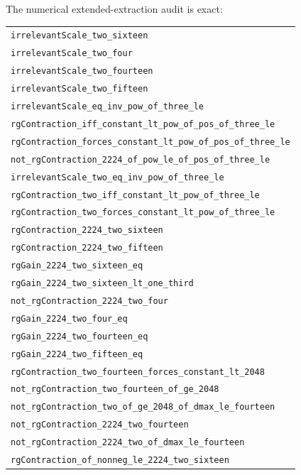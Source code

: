 \documentclass[11pt]{article}
\newcommand{\leansmall}[1]{{\small\texttt{#1}}}
\begin{document}
The numerical extended-extraction audit is exact:
\begin{center}
\begin{tabular}{l}
\leansmall{irrelevantScale\_two\_sixteen}\\
\leansmall{irrelevantScale\_two\_four}\\
\leansmall{irrelevantScale\_two\_fourteen}\\
\leansmall{irrelevantScale\_two\_fifteen}\\
\leansmall{irrelevantScale\_eq\_inv\_pow\_of\_three\_le}\\
\leansmall{rgContraction\_iff\_constant\_lt\_pow\_of\_pos\_of\_three\_le}\\
\leansmall{rgContraction\_forces\_constant\_lt\_pow\_of\_pos\_of\_three\_le}\\
\leansmall{not\_rgContraction\_2224\_of\_pow\_le\_of\_pos\_of\_three\_le}\\
\leansmall{irrelevantScale\_two\_eq\_inv\_pow\_of\_three\_le}\\
\leansmall{rgContraction\_two\_iff\_constant\_lt\_pow\_of\_three\_le}\\
\leansmall{rgContraction\_two\_forces\_constant\_lt\_pow\_of\_three\_le}\\
\leansmall{rgContraction\_2224\_two\_sixteen}\\
\leansmall{rgContraction\_2224\_two\_fifteen}\\
\leansmall{rgGain\_2224\_two\_sixteen\_eq}\\
\leansmall{rgGain\_2224\_two\_sixteen\_lt\_one\_third}\\
\leansmall{not\_rgContraction\_2224\_two\_four}\\
\leansmall{rgGain\_2224\_two\_four\_eq}\\
\leansmall{rgGain\_2224\_two\_fourteen\_eq}\\
\leansmall{rgGain\_2224\_two\_fifteen\_eq}\\
\leansmall{rgContraction\_two\_fourteen\_forces\_constant\_lt\_2048}\\
\leansmall{not\_rgContraction\_two\_fourteen\_of\_ge\_2048}\\
\leansmall{not\_rgContraction\_two\_of\_ge\_2048\_of\_dmax\_le\_fourteen}\\
\leansmall{not\_rgContraction\_2224\_two\_fourteen}\\
\leansmall{not\_rgContraction\_2224\_two\_of\_dmax\_le\_fourteen}\\
\leansmall{rgContraction\_of\_nonneg\_le\_2224\_two\_sixteen}
\end{tabular}
\end{center}
\end{document}
